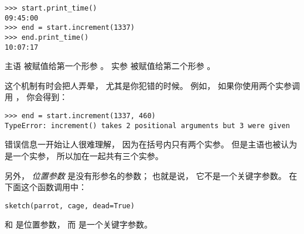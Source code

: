 \begin{lstlisting}
>>> start.print_time()
09:45:00
>>> end = start.increment(1337)
>>> end.print_time()
10:07:17
\end{lstlisting}

%

主语  被赋值给第一个形参 。
实参  被赋值给第二个形参  。


这个机制有时会把人弄晕， 尤其是你犯错的时候。
例如， 如果你使用两个实参调用 ，  你会得到：
  

\begin{lstlisting}
>>> end = start.increment(1337, 460)
TypeError: increment() takes 2 positional arguments but 3 were given
\end{lstlisting}

%

错误信息一开始让人很难理解， 因为在括号内只有两个实参。
但是主语也被认为是一个实参， 所以加在一起共有三个实参。

另外，  {\em 位置参数} 是没有形参名的参数； 也就是说， 它不是一个关键字参数。
在下面这个函数调用中：
  

\begin{lstlisting}
sketch(parrot, cage, dead=True)
\end{lstlisting}


 和  是位置参数， 而  是一个关键字参数。

